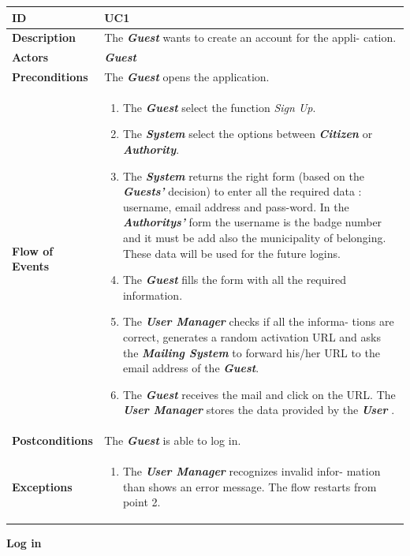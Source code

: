 \documentclass{report}
\begin{document}
\begin{tabularx}{\linewidth}{| l | X |}
	\hline
	\textbf{ID} & UC1\\
	
	\hline
	\textbf{Description} & The \textbf{\textit{Guest}} wants to create an account for the appli-
	cation.\\
	
	\hline
	\textbf{Actors} & \textbf{\textit{Guest}}\\
	
	\hline
	\textbf{Preconditions} & The \textbf{\textit{Guest}} opens the application.\\
	
	\hline
	\textbf{Flow of Events} & \parbox{0.7\textwidth}{\begin{enumerate}
			\item The \textbf{\textit{Guest}} select the function \textit{Sign Up}.
			\item The \textbf{\textit{System}} select the options between \textbf{\textit{Citizen}} or \textbf{\textit{Authority}}.
			\item The \textbf{\textit{System}} returns the right form (based on the \textbf{\textit{Guests'}} decision) to enter all the required data
			: username, email address and pass-word. In the \textbf{\textit{Authoritys'}} form the username is the badge number and it must be add also the municipality of belonging. These data will be used for the future logins.	
			\item The \textbf{\textit{Guest}} fills the form with all the required information.
			\item The \textbf{\textit{User Manager}} checks if all the informa-
			tions are correct, generates a random activation
			URL and asks the \textbf{\textit{Mailing System}} to forward his/her URL to the email address of the \textbf{\textit{Guest}}.
			\item The \textbf{\textit{Guest}} receives the mail and click on the URL. The \textbf{\textit{User Manager}} stores the data provided by the \textbf{\textit{User}} .
			
	\end{enumerate}}\\
	
	\hline
	\textbf{Postconditions} & The \textbf{\textit{Guest}} is able to log in.\\
	
	\hline
	\textbf{Exceptions} & \parbox{0.7\textwidth}{ \begin{enumerate}
			\item The \textbf{\textit{User Manager}} recognizes invalid infor-
			mation than shows an error message. The flow
			restarts from point 2. 
		\end{enumerate}}\\
	
	\hline
	
\end{tabularx}
\begin{center}
	\textbf{Log in}
\end{center}
\end{document}
